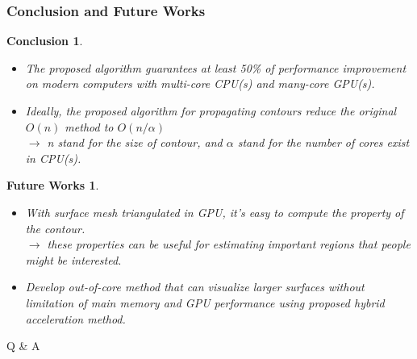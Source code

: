 \documentclass[8pt]{beamer}
\begin{document}
\newtheorem{conclusion}{Conclusion}
\newtheorem{futureworks}{Future Works}
\begin{frame}
  \frametitle{Conclusion and Future Works}
  \begin{conclusion}
    \begin{itemize}
    \item The proposed algorithm guarantees at least 50\% of performance improvement on modern 
      computers with multi-core CPU(s) and many-core GPU(s).
    \end{itemize}
    \begin{itemize}
    \item Ideally, the proposed algorithm for propagating contours reduce the original $O(n)$ method 
      to $O(n/\alpha)$\\
      $\rightarrow$ \emph{n} stand for the size of contour, and $\alpha$ stand for the number 
      of cores exist in CPU(s).
    \end{itemize}
  \end{conclusion}
  \begin{futureworks}
    \begin{itemize}
    \item With surface mesh triangulated in GPU, it's easy to compute the property of the contour.\\
      $\rightarrow$ these properties can be useful for estimating important regions that people might be interested.
    \item Develop out-of-core method that can visualize larger surfaces without limitation of main memory 
      and GPU performance using proposed hybrid acceleration method.
    \end{itemize}
  \end{futureworks}
\end{frame}
\note{}

\begin{frame}{Q \& A}
  \begin{center}
    \Large{}\\
    \normalsize{}
  \end{center}
\end{frame}
\end{document}
